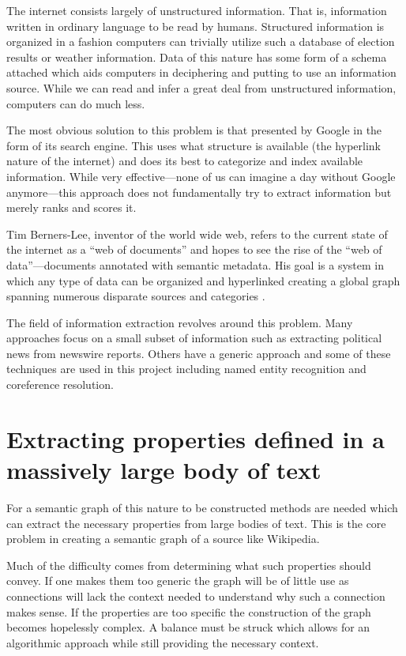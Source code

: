 The internet consists largely of unstructured information.  That is, information written in ordinary language to be read by humans.  Structured information is organized in a fashion computers can trivially utilize such a database of election results or weather information.  Data of this nature has some form of a schema attached which aids computers in deciphering and putting to use an information source.  While we can read and infer a great deal from unstructured information, computers can do much less.

The most obvious solution to this problem is that presented by Google in the form of its search engine.  This uses what structure is available (the hyperlink nature of the internet) and does its best to categorize and index available information.  While very effective---none of us can imagine a day without Google anymore---this approach does not fundamentally try to extract information but merely ranks and scores it.  

Tim Berners-Lee, inventor of the world wide web, refers to the current state of the internet as a ``web of documents'' and hopes to see the rise of the ``web of data''---documents annotated with semantic metadata.  His goal is a system in which any type of data can be organized and hyperlinked creating a global graph spanning numerous disparate sources and categories \cite{RN25892292820090101}.

The field of information extraction revolves around this problem.  Many approaches focus on a small subset of information such as extracting political news from newswire reports.  Others have a generic approach and some of these techniques are used in this project including named entity recognition and coreference resolution.  

\section{Extracting properties defined in a massively large body of text}

For a semantic graph of this nature to be constructed methods are needed which can extract the necessary properties from large bodies of text.  This is the core problem in creating a semantic graph of a source like Wikipedia.  

Much of the difficulty comes from determining what such properties should convey.  If one makes them too generic the graph will be of little use as connections will lack the context needed to understand why such a connection makes sense.  If the properties are too specific the construction of the graph becomes hopelessly complex.  A balance must be struck which allows for an algorithmic approach while still providing the necessary context.

